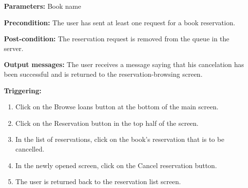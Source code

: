 \begin{description}

\item \textbf{Parameters:} Book name

\item \textbf{Precondition:} The user has sent at least one request for a book
reservation.

\item \textbf{Post-condition:} The reservation request is removed from the
queue in the server.

\item \textbf{Output messages:} The user receives a message saying that his
cancelation has been successful and is returned to the reservation-browsing
screen.

\item \textbf{Triggering:}
\begin{enumerate}
\item Click on the Browse loans button at the bottom of the main screen.

\item Click on the Reservation button in the top half of the screen.

\item  In the list of reservations, click on the book's reservation that is to
be cancelled.

\item In the newly opened screen, click on the Cancel reservation button.

\item The user is returned back to the reservation list screen.

\end{enumerate}

\end{description}